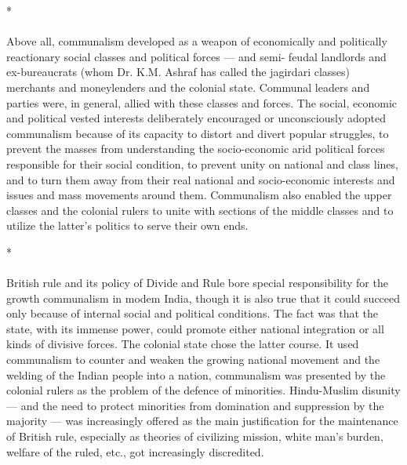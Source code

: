 \begin{multicols}{2}
\begin{center}*\end{center}

\paragraph*{}

Above all, communalism developed as a weapon of economically and politically reactionary social classes and political forces --- and semi- feudal landlords and ex-bureaucrats (whom Dr. K.M. Ashraf has called the jagirdari classes) merchants and moneylenders and the colonial state. Communal leaders and parties were, in general, allied with these classes and forces. The social, economic and political vested interests deliberately encouraged or unconsciously adopted communalism because of its capacity to distort and divert popular struggles, to prevent the masses from understanding the socio-economic arid political forces responsible for their social condition, to prevent unity on national and class lines, and to turn them away from their real national and socio-economic interests and issues and mass movements around them. Communalism also enabled the upper classes and the colonial rulers to unite with sections of the middle classes and to utilize the latter's politics to serve their own ends.

\begin{center}*\end{center}

\paragraph*{}
British rule and its policy of Divide and Rule bore special responsibility for the growth communalism in modem India, though it is also true that it could succeed only because of internal social and political conditions. The fact was that the state, with its immense power, could promote either national integration or all kinds of divisive forces. The colonial state chose the latter course. It used communalism to counter and weaken the growing national movement and the welding of the Indian people into a nation, communalism was presented by the colonial rulers as the problem of the defence of minorities. Hindu-Muslim disunity --- and the need to protect minorities from domination and suppression by the majority --- was increasingly offered as the main justification for the maintenance of British rule, especially as theories of civilizing mission, white man's burden, welfare of the ruled, etc., got increasingly discredited.


\end{multicols}
